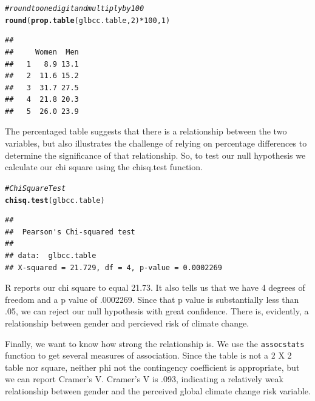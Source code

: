 \documentclass[11pt,openany]{book}\usepackage[]{graphicx}\usepackage[]{color}
\makeatletter
\newcommand{\hlnum}[1]{\textcolor[rgb]{0.686,0.059,0.569}{#1}}%
\newcommand{\hlcom}[1]{\textcolor[rgb]{0.678,0.584,0.686}{\textit{#1}}}%
\newcommand{\hlopt}[1]{\textcolor[rgb]{0,0,0}{#1}}%
\newcommand{\hlstd}[1]{\textcolor[rgb]{0.345,0.345,0.345}{#1}}%
\newcommand{\hlkwd}[1]{\textcolor[rgb]{0.737,0.353,0.396}{\textbf{#1}}}%
\newenvironment{kframe}{%
 \def\at@end@of@kframe{}%
 \ifinner\ifhmode%
  \def\at@end@of@kframe{\end{minipage}}%
  \begin{minipage}{\columnwidth}%
 \fi\fi%
 \def\FrameCommand##1{\hskip\@totalleftmargin \hskip-\fboxsep
 \colorbox{shadecolor}{##1}\hskip-\fboxsep
     \hskip-\linewidth \hskip-\@totalleftmargin \hskip\columnwidth}%
 \MakeFramed {\advance\hsize-\width
   \@totalleftmargin\z@ \linewidth\hsize
   \@setminipage}}%
 {\par\unskip\endMakeFramed%
 \at@end@of@kframe}
\newenvironment{knitrout}{}{} %
\renewenvironment{knitrout}{\begin{singlespace}}{\end{singlespace}}
\makeatother
\begin{document}
\begin{knitrout}
\color{fgcolor}\begin{kframe}
\begin{alltt}
\hlcom{# round to one digit and multiply by 100}
\hlkwd{round}\hlstd{(}\hlkwd{prop.table}\hlstd{(glbcc.table,} \hlnum{2}\hlstd{)} \hlopt{*} \hlnum{100}\hlstd{,} \hlnum{1}\hlstd{)}
\end{alltt}
\begin{verbatim}
##    
##     Women  Men
##   1   8.9 13.1
##   2  11.6 15.2
##   3  31.7 27.5
##   4  21.8 20.3
##   5  26.0 23.9
\end{verbatim}
\end{kframe}
\end{knitrout}
  
The percentaged table suggests that there is a relationship between the two variables, but also illustrates the challenge of relying on percentage differences to determine the significance of that relationship.  So, to test our null hypothesis we calculate our chi square using the chisq.test function.  

\begin{knitrout}
\color{fgcolor}\begin{kframe}
\begin{alltt}
\hlcom{# Chi Square Test}
\hlkwd{chisq.test}\hlstd{(glbcc.table)}
\end{alltt}
\begin{verbatim}
## 
## 	Pearson's Chi-squared test
## 
## data:  glbcc.table
## X-squared = 21.729, df = 4, p-value = 0.0002269
\end{verbatim}
\end{kframe}
\end{knitrout}

R reports our chi square to equal 21.73.  It also tells us that we have 4 degrees of freedom and a p value of .0002269.  Since that p value is substantially less than .05, we can reject our null hypothesis with great confidence.  There is, evidently, a relationship between gender and percieved risk of climate change.

Finally, we want to know how strong the relationship is.  We use the \texttt{assocstats} function to get several measures of association.   Since the table is not a 2 X 2 table nor square, neither phi not the contingency coefficient is appropriate, but we can report Cramer's V.  Cramer's V is .093, indicating a relatively weak relationship between gender and the perceived global climate change risk variable.
\end{document}
